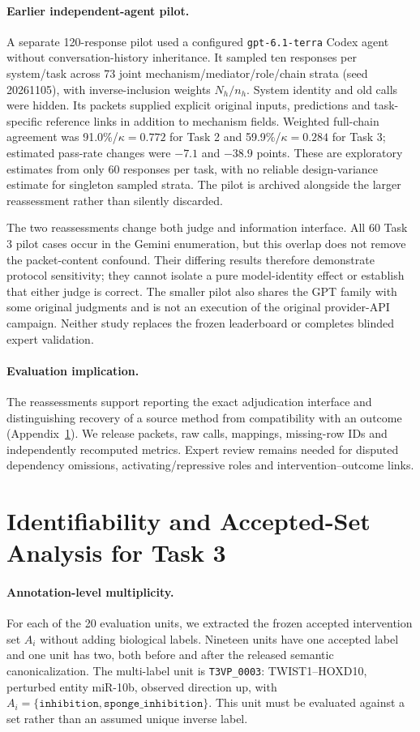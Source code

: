 \paragraph{Earlier independent-agent pilot.} A separate 120-response pilot used a configured \texttt{gpt-6.1-terra} Codex agent without conversation-history inheritance. It sampled ten responses per system/task across 73 joint mechanism/mediator/role/chain strata (seed 20261105), with inverse-inclusion weights $N_h/n_h$. System identity and old calls were hidden. Its packets supplied explicit original inputs, predictions and task-specific reference links in addition to mechanism fields. Weighted full-chain agreement was 91.0\%/$\kappa=0.772$ for Task 2 and 59.9\%/$\kappa=0.284$ for Task 3; estimated pass-rate changes were $-7.1$ and $-38.9$ points. These are exploratory estimates from only 60 responses per task, with no reliable design-variance estimate for singleton sampled strata. The pilot is archived alongside the larger reassessment rather than silently discarded.

The two reassessments change both judge and information interface. All 60 Task 3 pilot cases occur in the Gemini enumeration, but this overlap does not remove the packet-content confound. Their differing results therefore demonstrate protocol sensitivity; they cannot isolate a pure model-identity effect or establish that either judge is correct. The smaller pilot also shares the GPT family with some original judgments and is not an execution of the original provider-API campaign. Neither study replaces the frozen leaderboard or completes blinded expert validation.

\paragraph{Evaluation implication.} The reassessments support reporting the exact adjudication interface and distinguishing recovery of a source method from compatibility with an outcome (Appendix~\ref{app:accepted_sets}). We release packets, raw calls, mappings, missing-row IDs and independently recomputed metrics. Expert review remains needed for disputed dependency omissions, activating/repressive roles and intervention--outcome links.
\clearpage
\section{Identifiability and Accepted-Set Analysis for Task 3}\label{app:accepted_sets}
\paragraph{Annotation-level multiplicity.} For each of the 20 evaluation units, we extracted the frozen accepted intervention set $A_i$ without adding biological labels. Nineteen units have one accepted label and one unit has two, both before and after the released semantic canonicalization. The multi-label unit is \texttt{T3VP\_0003}: TWIST1--HOXD10, perturbed entity miR-10b, observed direction up, with $A_i=\{\texttt{inhibition},\texttt{sponge\_inhibition}\}$. This unit must be evaluated against a set rather than an assumed unique inverse label.

